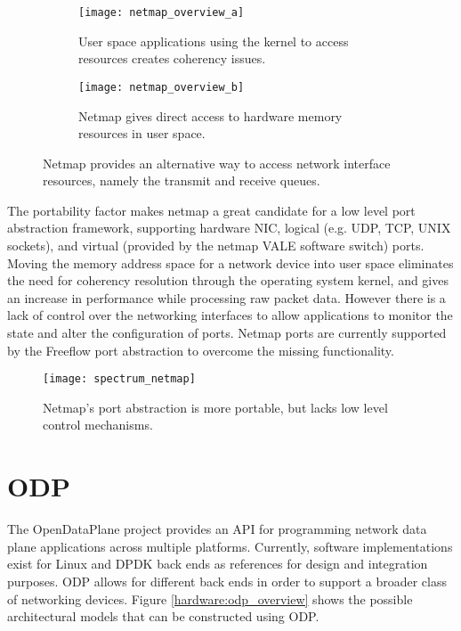 \begin{figure}[h!]
  \centering
  \begin{subfigure}[b]{0.48\textwidth}
    \centering
    \texttt{[image: netmap\_overview\_a]}
    \caption{User space applications using the kernel to access resources
    creates coherency issues.}
  \end{subfigure}
  \hfill
  \begin{subfigure}[b]{0.48\textwidth}
    \centering
    \texttt{[image: netmap\_overview\_b]}
    \caption{Netmap gives direct access to hardware memory resources in user
    space.}
  \end{subfigure}
  \caption{Netmap provides an alternative way to access network interface
  resources, namely the transmit and receive queues.}
  \label{hardware:netmap_overview}
\end{figure}

The portability factor makes netmap a great candidate for a low level port
abstraction framework, supporting hardware NIC, logical (e.g. UDP, TCP,
UNIX sockets), and virtual (provided by the netmap VALE software switch) ports.
Moving the memory address space for a network device into user space eliminates
the need for coherency resolution through the operating system kernel, and gives
an increase in performance while processing raw packet data. However there is a
lack of control over the networking interfaces to allow applications to monitor
the state and alter the configuration of ports. Netmap ports are currently
supported by the Freeflow port abstraction to overcome the missing
functionality.

\begin{figure}[h!]
  \centering
  \texttt{[image: spectrum\_netmap]}
  \caption{Netmap's port abstraction is more portable, but lacks low level
  control mechanisms.}
  \label{hardware:spectrum_netmap}
\end{figure}

\section{ODP}
\label{hardware:odp}
The OpenDataPlane project provides an API for programming network data plane
applications across multiple platforms. Currently, software implementations
exist for Linux and DPDK back ends as references for design and integration
purposes. ODP allows for different back ends in order to support a broader class
of networking devices. Figure \ref{hardware:odp_overview} shows the possible
architectural models that can be constructed using ODP.

